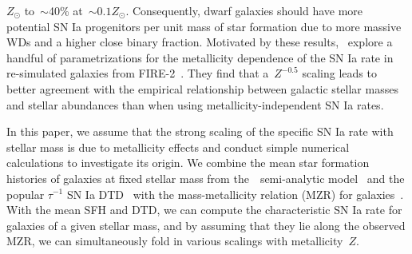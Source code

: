 \documentclass[ms.tex]{subfiles}
\begin{document}
$Z_\odot$ to~$\sim$40\% at~$\sim$$0.1 Z_\odot$.
Consequently, dwarf galaxies should have more potential SN Ia progenitors per
unit mass of star formation due to more massive WDs and a higher close binary
fraction.
Motivated by these results,~\citet{Gandhi2022} explore a handful of
parametrizations for the metallicity dependence of the SN Ia rate in
re-simulated galaxies from FIRE-2~\citep{Hopkins2018}.
They find that a~$Z^{-0.5}$ scaling leads to better agreement with the empirical
relationship between galactic stellar masses and stellar abundances than when
using metallicity-independent SN Ia rates.
\par
In this paper, we assume that the strong scaling of the specific SN Ia rate
with stellar mass is due to metallicity effects and conduct simple numerical
calculations to investigate its origin.
We combine the mean star formation histories of galaxies at fixed stellar
mass from the~\um~semi-analytic model~\citep{Behroozi2019} and the popular
$\tau^{-1}$ SN Ia DTD~\citep[e.g.,][]{Maoz2012a} with the mass-metallicity
relation (MZR) for galaxies~\citep{Tremonti2004, Andrews2013, Zahid2011,
Zahid2014}.
With the mean SFH and DTD, we can compute the characteristic SN Ia rate for
galaxies of a given stellar mass, and by assuming that they lie along the
observed MZR, we can simultaneously fold in various scalings with
metallicity~$Z$.
\end{document}
